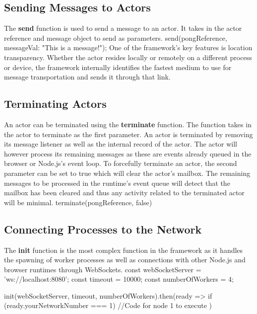 \documentclass[12pt, a4paper]{report}
\newenvironment{code}
{\footnotesize\verbatim}{\endverbatim\normalfont}
\theoremstyle{definition}
\theoremstyle{definition}%
\theoremstyle{definition}%
\theoremstyle{definition}%
\theoremstyle{definition}%
\theoremstyle{definition}%
\begin{document}
\subsection{Sending Messages to Actors}
The \textbf{send} function is used to send a message to an actor. It takes in the actor reference and message object to send as parameters.
\begin{code}
send(pongReference, {messageVal: "This is a message!"});
\end{code}
One of the framework's key features is location transparency. Whether the actor resides locally or remotely on a different process or device, the framework internally identifies the fastest medium to use for message transportation and sends it through that link.
\subsection{Terminating Actors}
An actor can be terminated using the \textbf{terminate} function. The function takes in the actor to terminate as the first parameter. An actor is terminated by removing its message listener as well as the internal record of the actor. The actor will however process its remaining messages as these are events already queued in the browser or Node.js's event loop. To forcefully terminate an actor, the second parameter can be set to true which will clear the actor's mailbox. The remaining messages to be processed in the runtime's event queue will detect that the mailbox has been cleared and thus any activity related to the terminated actor will be minimal.
\begin{code}
terminate(pongReference, false)
\end{code}
\subsection{Connecting Processes to the Network}
The \textbf{init} function is the most complex function in the framework as it handles the spawning of worker processes as well as connections with other Node.js and browser runtimes through WebSockets.
\begin{code}
const webSocketServer = 'ws://localhost:8080';
const timeout = 10000;
const numberOfWorkers = 4;

init(webSocketServer, timeout, numberOfWorkers).then(ready => {
    if (ready.yourNetworkNumber === 1) {
        //Code for node 1 to execute
    }
})
\end{code}
 
\end{document}
